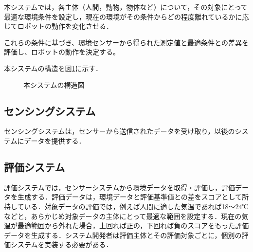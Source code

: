 \documentclass[paper=a4paper,jafontsize=9pt,head_space=15mm,gutter=20mm,
twocolumn,number_of_lines=49, line_length=26zw]{myuarticle}
\begin{document}
本システムでは，各主体（人間，動物，物体など）について，その対象にとって最適な環境条件を設定し，現在の環境がその条件からどの程度離れているかに応じてロボットの動作を変化させる．

これらの条件に基づき、環境センサーから得られた測定値と最適条件との差異を評価し、ロボットの動作を決定する。

本システムの構造を図\ref{fig:system-structure}に示す．

\fboxsep=0pt            %
\fboxrule=1pt            %
\begin{figure}[h]
  \centering
  \caption{本システムの構造図}
  \label{fig:system-structure}
\end{figure}

\subsection{センシングシステム}

センシングシステムは，センサーから送信されたデータを受け取り，以後のシステムにデータを提供する．

\subsection{評価システム}
評価システムでは，センサーシステムから環境データを取得・評価し，評価データを生成する．評価データは，環境データと評価基準値との差をスコアとして所持している．対象データの評価では，例えば人間に適した気温であれば18～24℃などと，あらかじめ対象データの主体にとって最適な範囲を設定する．現在の気温が最適範囲から外れた場合，上回れば正の，下回れば負のスコアをもった評価データを生成する．システム開発者は評価主体とその評価対象ごとに，個別の評価システムを実装する必要がある．
\end{document}
